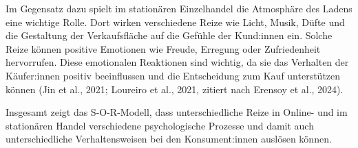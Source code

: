 Im Gegensatz dazu spielt im stationären Einzelhandel die Atmosphäre des Ladens eine wichtige Rolle. Dort wirken verschiedene Reize wie Licht, Musik, Düfte und die Gestaltung der Verkaufsfläche auf die Gefühle der Kund:innen ein. Solche Reize können positive Emotionen wie Freude, Erregung oder Zufriedenheit hervorrufen. Diese emotionalen Reaktionen sind wichtig, da sie das Verhalten der Käufer:innen positiv beeinflussen und die Entscheidung zum Kauf unterstützen können (Jin et al., 2021; Loureiro et al., 2021, zitiert nach Erensoy et al., 2024).  

Insgesamt zeigt das S-O-R-Modell, dass unterschiedliche Reize in Online- und im stationären Handel verschiedene psychologische Prozesse und damit auch unterschiedliche Verhaltensweisen bei den Konsument:innen auslösen können. 